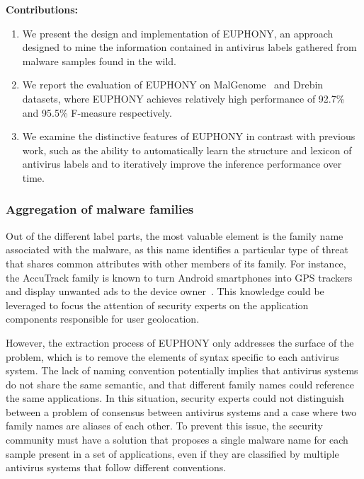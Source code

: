 \begin{mdframed}[hidealllines=true,nobreak=true]
\textbf{Contributions:}

\begin{enumerate}
	\item We present the design and implementation of EUPHONY, an approach designed to mine the information contained in antivirus labels gathered from malware samples found in the wild.
	\item We report the evaluation of EUPHONY on MalGenome~\cite{zhou_dissecting_2012} and Drebin~\cite{arp_drebin:_2014} datasets, where EUPHONY achieves relatively high performance of 92.7\% and 95.5\% F-measure respectively.
	\item We examine the distinctive features of EUPHONY in contrast with previous work, such as the ability to automatically learn the structure and lexicon of antivirus labels and to iteratively improve the inference performance over time.
\end{enumerate}
\end{mdframed}

\subsubsection{Aggregation of malware families}
Out of the different label parts, the most valuable element is the family name associated with the malware, as this name identifies a particular type of threat that shares common attributes with other members of its family.
For instance, the AccuTrack family is known to turn Android smartphones into GPS trackers and display unwanted ads to the device owner~\cite{solvusoft_how_nodate}.
This knowledge could be leveraged to focus the attention of security experts on the application components responsible for user geolocation.

However, the extraction process of EUPHONY only addresses the surface of the problem, which is to remove the elements of syntax specific to each antivirus system.
The lack of naming convention potentially implies that antivirus systems do not share the same semantic, and that different family names could reference the same applications.
In this situation, security experts could not distinguish between a problem of consensus between antivirus systems and a case where two family names are aliases of each other.
To prevent this issue, the security community must have a solution that proposes a single malware name for each sample present in a set of applications, even if they are classified by multiple antivirus systems that follow different conventions.

